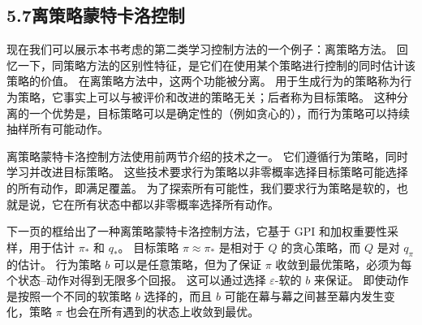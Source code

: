 \documentclass[UTF8, 12pt, fontset=fandol, oneside]{ctexart}
\begin{document}
\subsection*{5.7\quad 离策略蒙特卡洛控制}

现在我们可以展示本书考虑的第二类学习控制方法的一个例子：离策略方法。
回忆一下，同策略方法的区别性特征，是它们在使用某个策略进行控制的同时估计该策略的价值。
在离策略方法中，这两个功能被分离。
用于生成行为的策略称为行为策略，它事实上可以与被评价和改进的策略无关；后者称为目标策略。
这种分离的一个优势是，目标策略可以是确定性的（例如贪心的），而行为策略可以持续抽样所有可能动作。

离策略蒙特卡洛控制方法使用前两节介绍的技术之一。
它们遵循行为策略，同时学习并改进目标策略。
这些技术要求行为策略以非零概率选择目标策略可能选择的所有动作，即满足覆盖。
为了探索所有可能性，我们要求行为策略是软的，也就是说，它在所有状态中都以非零概率选择所有动作。

下一页的框给出了一种离策略蒙特卡洛控制方法，它基于 GPI 和加权重要性采样，用于估计 $\pi_*$ 和 $q_*$。
目标策略 $\pi\approx\pi_*$ 是相对于 $Q$ 的贪心策略，而 $Q$ 是对 $q_\pi$ 的估计。
行为策略 $b$ 可以是任意策略，但为了保证 $\pi$ 收敛到最优策略，必须为每个状态--动作对得到无限多个回报。
这可以通过选择 $\varepsilon$-软的 $b$ 来保证。
即使动作是按照一个不同的软策略 $b$ 选择的，而且 $b$ 可能在幕与幕之间甚至幕内发生变化，策略 $\pi$ 也会在所有遇到的状态上收敛到最优。

\begin{center}
\end{center}
\end{document}
